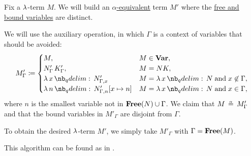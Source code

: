 \begin{algorithm}\label{alg:separation_of_free_and_bound_variables}
  Fix a \( \mathrm{\lambda} \)-term \( M \). We will build an \hyperref[def:lambda_term_alpha_equivalence]{\( \alpha \)-equivalent} term \( M' \) where the \hyperref[def:lambda_variable_freeness]{free and bound variables} are distinct.

  We will use the auxiliary operation, in which \( \Gamma \) is a context of variables that should be avoided:
  \begin{equation*}
    M'_\Gamma \coloneqq \begin{cases}
      M,                                 &M \in \op*{Var}, \\
      N'_\Gamma \thinspace K'_\Gamma,    &M = NK, \\
      \qabs x N'_{\Gamma,x}              &M = \qabs x N \T{and} x \not\in \Gamma, \\
      \qabs n N'_{\Gamma,n}[x \mapsto n] &M = \qabs x N \T{and} x \in \Gamma,
    \end{cases}
  \end{equation*}
  where \( n \) is the smallest variable not in \( \op*{Free}(N) \cup \Gamma \). We claim that \( M \aequiv M'_\Gamma \) and that the bound variables in \( M'_\Gamma \) are disjoint from \( \Gamma \).

  To obtain the desired \( \mathrm{\lambda} \)-term \( M' \), we simply take \( M'_\Gamma \) with \( \Gamma = \op*{Free}(M) \).
\end{algorithm}
\begin{comments}
  \item This algorithm can be found as  in \cite{notebook:code}.
\end{comments}

